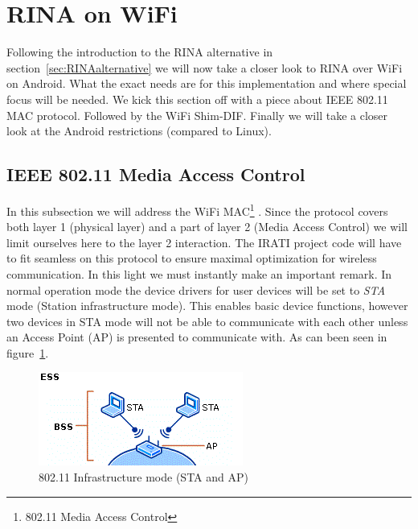 \section{RINA on WiFi}

Following the introduction to the RINA alternative in section~\ref{sec:RINAalternative} we will now take a closer look to RINA over WiFi on Android. What the exact needs are for this implementation and where special focus will be needed. We kick this section off with a piece about IEEE 802.11 MAC protocol. Followed by the WiFi Shim-DIF. Finally we will take a closer look at the Android restrictions (compared to Linux).

\subsection{IEEE 802.11 Media Access Control}

In this subsection we will address the WiFi MAC\footnote{802.11 Media Access Control} \citep{matthewgast2005}. Since the protocol covers both layer 1 (physical layer) and a part of layer 2 (Media Access Control) we will limit ourselves here to the layer 2 interaction. The IRATI project code will have to fit seamless on this protocol to ensure maximal optimization for wireless communication. In this light we must instantly make an important remark. In normal operation mode the device drivers for user devices will be set to \emph{STA} mode (Station infrastructure mode). This enables basic device functions, however two devices in STA mode will not be able to communicate with each other unless an Access Point (AP) is presented to communicate with. As can been seen in figure~\ref{fig:80211inframode}.

\begin{figure}[H]
    \centering
    \includegraphics{figures/80211inframode}
    \caption{802.11 Infrastructure mode (STA and AP) \citep{website:80211microsoft}} 
    \label{fig:80211inframode}
\end{figure}

\npar

